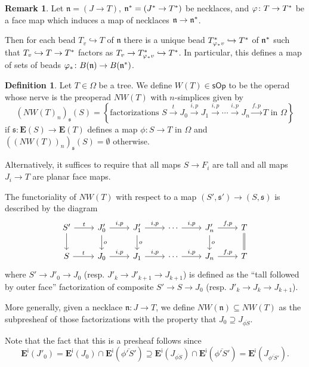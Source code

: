 \documentclass[a4paper,10pt]{article}%
\numberwithin{equation}{section}
\numberwithin{figure}{section}
\theoremstyle{definition} %
\newtheorem{definition}[equation]{Definition}%
\newtheorem{remark}[equation]{Remark}%
\newcommand{\1}{\ensuremath{\mathbbm 1}}%
\begin{document}
\begin{remark}\label{BEADMAP REM}
	Let $\mathfrak{n} = (J \to T)$,
	$\mathfrak{n}^{\**} = (J^{\**} \to T^{\**})$
	be necklaces,
	and $\varphi \colon T \to T^{\**}$
	be a face map which induces a map of necklaces
	$\mathfrak{n} \to \mathfrak{n}^{\**}$.

	Then for each bead $T_{v} \hookrightarrow T$
	of $\mathfrak{n}$
	there is a unique bead
	$T^{\**}_{\varphi_{\**} v} \hookrightarrow T^{\**}$
	of $\mathfrak{n}^{\**}$
	such that
	$T_v \hookrightarrow T \to T^{\**}$
	factors as
	$T_v \to T^{\**}_{\varphi_{\**}v} \hookrightarrow T^{\**}$.
%	
	In particular, 
	this defines a map of sets of beads
	$\varphi_{\**} \colon 
	B(\mathfrak{n}) \to B(\mathfrak{n}^{\**})$.
\end{remark}



\begin{definition}\label{NWTNS DEF}
	Let $T \in \Omega$ be a tree.
	We define 
	$W(T) \in \mathsf{sOp}$
	to be the operad whose nerve is the preoperad
	$NW(T)$ with $n$-simplices given by
\[
	\left(NW(T)_n\right)_{\mathfrak{s}}(S)
=
	\left\{
	\text{factorizations }
	S \xrightarrow{t} 
	J_0 \xrightarrow{i,p} 
	J_1 \xrightarrow{i,p} 
	\cdots \xrightarrow{i,p}
	J_n \xrightarrow{f,p}
	T
	\text{ in $\Omega$}
	\right\}
\]
	if $\mathfrak{s} \colon \boldsymbol{E}(S) \to \boldsymbol{E}(T)$
	defines a map $\phi \colon S \to T$ in $\Omega$
	and
	$\left(\left(NW(T)\right)_n\right)_{\mathfrak{s}}(S) = \emptyset$
	otherwise.
	
	Alternatively, it suffices to require that all maps
	$S \to F_i$ are tall
	and all maps $J_i \to T$ are planar face maps.

	
	The functoriality of 
	$NW(T)$
	with respect to a map $(S', \mathfrak s') \to ({S},\mathfrak{s})$
	is described by the diagram
\[
\begin{tikzcd}
	S' \ar{r}{t} \ar{d}
&
	J'_0 \ar{r}{i,p} \ar{d}{o}
&
	J'_1 \ar{r}{i,p} \ar{d}{o}
&
	\cdots \ar{r}{i,p}
&
	J'_n \ar{r}{f,p} \ar{d}{o}
&
	T \ar[equal]{d}
\\
	S \ar{r}{t} 
&
	J_0 \ar{r}{i,p}
&
	J_1 \ar{r}{i,p}
&
	\cdots \ar{r}{i,p}
&
	J_n \ar{r}{f,p}
&
	T	
\end{tikzcd}
\]
	where 
	$S' \to J'_0 \to J_0$
	(resp. $J'_k \to J'_{k+1} \to J_{k+1}$)
	is defined as the ``tall followed by outer face''
	factorization of composite
	$S' \to S \to J_0$
	(resp. $J'_k \to J_{k} \to J_{k+1}$).

	More generally, 
	given a necklace $\mathfrak{n}\colon J \to T$,
	we define
	$NW(\mathfrak{n}) \subseteq NW(T)$
	as the subpresheaf
	of those factorizations with the property that
	$J_0 \supseteq J_{\overline{\phi S}}$.

	Note that the fact that this is a presheaf follows 
	since
\[
	\boldsymbol{E}^{\mathsf{i}}(J'_0)
=
	\boldsymbol{E}^{\mathsf{i}}(J_0)
	\cap
	\boldsymbol{E}^{\mathsf{i}}(\overline{\phi' S'})
\supseteq
	\boldsymbol{E}^{\mathsf{i}}(J_{\overline{\phi S}})
	\cap
	\boldsymbol{E}^{\mathsf{i}}(\overline{\phi' S'})
=
	\boldsymbol{E}^{\mathsf{i}}(J_{\overline{\phi' S'}}).
\]
\end{definition}
\end{document}
